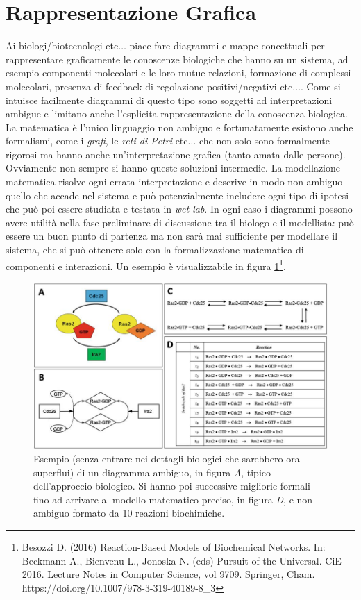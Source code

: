 \documentclass[a4paper,12pt, oneside]{book}
\begin{document}
\section{Rappresentazione Grafica}
Ai biologi/biotecnologi etc$\ldots$ piace fare diagrammi e mappe concettuali per
rappresentare graficamente le conoscenze biologiche che hanno su un sistema, ad
esempio componenti molecolari e le loro mutue relazioni, formazione di complessi
molecolari, presenza di feedback di regolazione positivi/negativi
etc$\ldots$. Come si intuisce facilmente diagrammi di questo tipo sono soggetti
ad interpretazioni ambigue e limitano anche l'esplicita rappresentazione della
conoscenza biologica. La matematica è l'unico linguaggio non ambiguo e
fortunatamente esistono anche formalismi, come i \textit{grafi}, le \textit{reti
  di Petri} etc$\ldots$ che non solo sono formalmente rigorosi ma hanno anche
un'interpretazione grafica (tanto amata dalle persone). Ovviamente non sempre si
hanno queste soluzioni intermedie. La modellazione
matematica risolve ogni errata interpretazione e descrive in modo non ambiguo
quello che accade nel sistema e può potenzialmente includere ogni tipo di
ipotesi che può poi essere studiata e testata in \textit{wet lab}. In ogni caso
i diagrammi possono avere utilità nella fase preliminare di discussione tra il
biologo e il modellista: può essere un buon punto di partenza ma non sarà mai
sufficiente per modellare il sistema, che si può ottenere solo con la
formalizzazione matematica di componenti e interazioni. Un esempio è
visualizzabile in figura \ref{fig:dia}\footnote{Besozzi D. (2016) Reaction-Based
  Models of Biochemical Networks. In: Beckmann A., Bienvenu L., Jonoska N. (eds)
  Pursuit of the Universal. CiE 2016. Lecture Notes in Computer Science, vol
  9709. Springer, Cham. https://doi.org/10.1007/978-3-319-40189-8\_3}. 
\begin{figure}
  \centering
  \includegraphics[scale = 0.4]{img/dia.jpg}
  \caption{Esempio (senza entrare nei dettagli biologici che sarebbero ora
    superflui) di un diagramma ambiguo, in figura \textit{A}, tipico 
    dell'approccio biologico. Si hanno poi successive migliorie formali fino ad
    arrivare al modello matematico preciso, in figura \textit{D}, e non ambiguo
    formato da 10 reazioni biochimiche.} 
  \label{fig:dia}
\end{figure}
\end{document}
